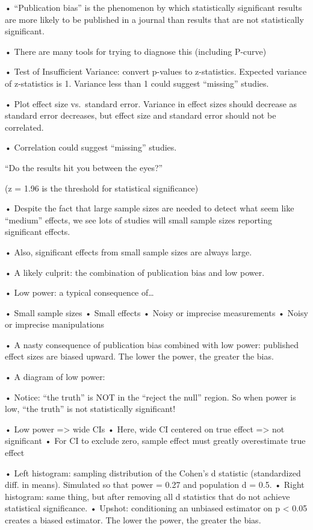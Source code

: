 \documentclass[
  letterpaper,
  DIV=11,
  numbers=noendperiod]{scrreprt}
\begin{document}
• ``Publication bias'' is the phenomenon by which statistically
significant results are more likely to be published in a journal than
results that are not statistically significant.

• There are many tools for trying to diagnose this (including P-curve)

• Test of Insufficient Variance: convert p-values to z-statistics.
Expected variance of z-statistics is 1. Variance less than 1 could
suggest ``missing'' studies.

• Plot effect size vs.~standard error. Variance in effect sizes should
decrease as standard error decreases, but effect size and standard error
should not be correlated.

• Correlation could suggest ``missing'' studies.

``Do the results hit you between the eyes?''

(z = 1.96 is the threshold for statistical significance)

• Despite the fact that large sample sizes are needed to detect what
seem like ``medium'' effects, we see lots of studies will small sample
sizes reporting significant effects.

• Also, significant effects from small sample sizes are always large.

• A likely culprit: the combination of publication bias and low power.

• Low power: a typical consequence of\ldots{}

• Small sample sizes • Small effects • Noisy or imprecise measurements •
Noisy or imprecise manipulations

• A nasty consequence of publication bias combined with low power:
published effect sizes are biased upward. The lower the power, the
greater the bias.

• A diagram of low power:

• Notice: ``the truth'' is NOT in the ``reject the null'' region. So
when power is low, ``the truth'' is not statistically significant!

• Low power =\textgreater{} wide CIs • Here, wide CI centered on true
effect =\textgreater{} not significant • For CI to exclude zero, sample
effect must greatly overestimate true effect

• Left histogram: sampling distribution of the Cohen's d statistic
(standardized diff. in means). Simulated so that power = 0.27 and
population d = 0.5. • Right histogram: same thing, but after removing
all d statistics that do not achieve statistical significance. • Upshot:
conditioning an unbiased estimator on p \textless{} 0.05 creates a
biased estimator. The lower the power, the greater the bias.
\end{document}
